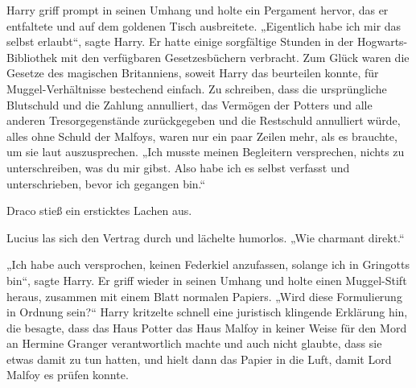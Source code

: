 Harry griff prompt in seinen Umhang und holte ein Pergament hervor, das er entfaltete und auf dem goldenen Tisch ausbreitete.
„Eigentlich habe ich mir das selbst erlaubt“, sagte Harry.
Er hatte einige sorgfältige Stunden in der Hogwarts-Bibliothek mit den verfügbaren Gesetzesbüchern verbracht. Zum Glück waren die Gesetze des magischen Britanniens, soweit Harry das beurteilen konnte, für Muggel-Verhältnisse bestechend einfach. Zu schreiben, dass die ursprüngliche Blutschuld und die Zahlung annulliert, das Vermögen der Potters und alle anderen Tresorgegenstände zurückgegeben und die Restschuld annulliert würde, alles ohne Schuld der Malfoys, waren nur ein paar Zeilen mehr, als es brauchte, um sie laut auszusprechen.
„Ich musste meinen Begleitern versprechen, nichts zu unterschreiben, was du mir gibst. Also habe ich es selbst verfasst und unterschrieben, bevor ich gegangen bin.“

Draco stieß ein ersticktes Lachen aus.

Lucius las sich den Vertrag durch und lächelte humorlos.
„Wie charmant direkt.“

„Ich habe auch versprochen, keinen Federkiel anzufassen, solange ich in Gringotts bin“, sagte Harry. Er griff wieder in seinen Umhang und holte einen Muggel-Stift heraus, zusammen mit einem Blatt normalen Papiers.
„Wird diese Formulierung in Ordnung sein?“
Harry kritzelte schnell eine juristisch klingende Erklärung hin, die besagte, dass das Haus Potter das Haus Malfoy in keiner Weise für den Mord an Hermine Granger verantwortlich machte und auch nicht glaubte, dass sie etwas damit zu tun hatten, und hielt dann das Papier in die Luft, damit Lord Malfoy es prüfen konnte.

